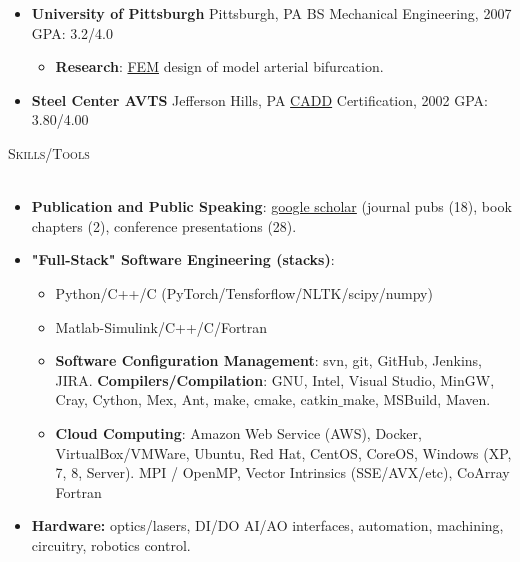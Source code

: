 \documentclass{article}
\newcommand{\lineunder}{\vspace*{-8pt} \\ \hspace*{-18pt} \hrulefill \\}
\newcommand{\header}[1]{{\hspace*{-15pt}\vspace*{6pt} \textsc{#1}} \vspace*{-6pt} \lineunder}
\newenvironment{achievements}{\begin{list}{$\bullet$}{\topsep 0pt \itemsep -2pt}}{\vspace*{4pt}\end{list}}
\begin{document}
\begin{itemize}[leftmargin=*]
  \item \textbf{University of Pittsburgh} Pittsburgh, PA BS Mechanical Engineering, 2007 GPA: 3.2/4.0
  \begin{itemize}
    \item \textbf{Research}: \href{http://en.wikipedia.org/wiki/Finite_element_method}{FEM} design of model arterial bifurcation.
  \end{itemize}

  \item \textbf{Steel Center AVTS} Jefferson Hills, PA \href{http://en.wikipedia.org/wiki/Computer-aided_design}{CADD} Certification, 2002 GPA: 3.80/4.00

\end{itemize}

\header{\Large{Skills/Tools}}


\begin{itemize}[leftmargin=*]

  \item \textbf{Publication and Public Speaking}: \href{https://scholar.google.com/citations?hl=en&user=ry2klw0AAAAJ}{google scholar} (journal pubs (18), book chapters (2), conference presentations (28).

  \item \textbf{"Full-Stack" Software Engineering (stacks)}: 
  \begin{itemize}
    \item Python/C++/C (PyTorch/Tensforflow/NLTK/scipy/numpy)
    \item Matlab-Simulink/C++/C/Fortran    
    \item \textbf{Software Configuration Management}: svn, git, GitHub, Jenkins, JIRA.  \textbf{Compilers/Compilation}: GNU, Intel, Visual Studio, MinGW, Cray, Cython, Mex, Ant, make, cmake, catkin$\_$make, MSBuild, Maven. 
    \item \textbf{Cloud Computing}: Amazon Web Service (AWS), Docker, VirtualBox/VMWare, Ubuntu, Red Hat, CentOS, CoreOS, Windows (XP, 7, 8, Server). MPI / OpenMP, Vector Intrinsics (SSE/AVX/etc), CoArray Fortran
  \end{itemize}

  \item \textbf{Hardware:} optics/lasers, DI/DO AI/AO interfaces, automation, machining, circuitry,  robotics control.
 
\end{itemize}
\end{document}
